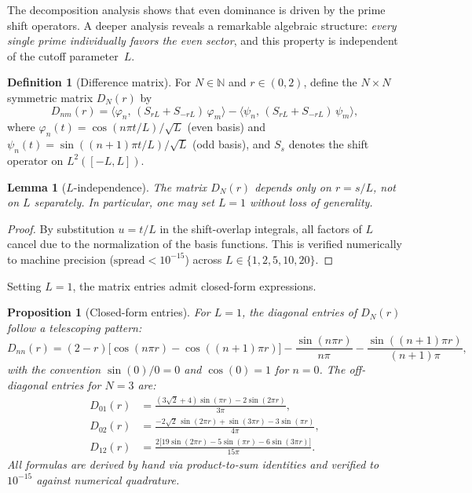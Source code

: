 \documentclass[12pt,a4paper]{article}
\newtheorem{lemma}[theorem]{Lemma}
\newtheorem{proposition}[theorem]{Proposition}
\theoremstyle{definition}
\newtheorem{definition}[theorem]{Definition}
\theoremstyle{remark}
\begin{document}
The decomposition analysis shows that even dominance is driven by the prime shift operators. A deeper analysis reveals a remarkable algebraic structure: \emph{every single prime individually favors the even sector}, and this property is independent of the cutoff parameter~$L$.

\begin{definition}[Difference matrix]
\label{def:D-matrix}
For $N \in \mathbb{N}$ and $r \in (0,2)$, define the $N \times N$ symmetric matrix $D_N(r)$ by
\[
  D_{nm}(r) = \langle \varphi_n,\, (S_{rL} + S_{-rL})\,\varphi_m \rangle
            - \langle \psi_n,\, (S_{rL} + S_{-rL})\,\psi_m \rangle,
\]
where $\varphi_n(t) = \cos(n\pi t/L)/\sqrt{L}$ (even basis) and $\psi_n(t) = \sin((n+1)\pi t/L)/\sqrt{L}$ (odd basis), and $S_s$ denotes the shift operator on $L^2([-L,L])$.
\end{definition}

\begin{lemma}[$L$-independence]
\label{lem:L-indep}
The matrix $D_N(r)$ depends only on $r = s/L$, not on $L$ separately. In particular, one may set $L = 1$ without loss of generality.
\end{lemma}

\begin{proof}
By substitution $u = t/L$ in the shift-overlap integrals, all factors of $L$ cancel due to the normalization of the basis functions. This is verified numerically to machine precision ($\text{spread} < 10^{-15}$) across $L \in \{1, 2, 5, 10, 20\}$.
\end{proof}

Setting $L=1$, the matrix entries admit closed-form expressions.

\begin{proposition}[Closed-form entries]
\label{prop:closed-form}
For $L = 1$, the diagonal entries of $D_N(r)$ follow a telescoping pattern:
\[
  D_{nn}(r) = (2-r)\bigl[\cos(n\pi r) - \cos((n{+}1)\pi r)\bigr]
  - \frac{\sin(n\pi r)}{n\pi} - \frac{\sin((n{+}1)\pi r)}{(n{+}1)\pi},
\]
with the convention $\sin(0)/0 = 0$ and $\cos(0) = 1$ for $n = 0$. The off-diagonal entries for $N = 3$ are:
\begin{align*}
  D_{01}(r) &= \frac{(3\sqrt{2}+4)\sin(\pi r) - 2\sin(2\pi r)}{3\pi}, \\
  D_{02}(r) &= \frac{-2\sqrt{2}\,\sin(2\pi r) + \sin(3\pi r) - 3\sin(\pi r)}{4\pi}, \\
  D_{12}(r) &= \frac{2\bigl[19\sin(2\pi r) - 5\sin(\pi r) - 6\sin(3\pi r)\bigr]}{15\pi}.
\end{align*}
All formulas are derived by hand via product-to-sum identities and verified to $10^{-15}$ against numerical quadrature.
\end{proposition}
\end{document}

